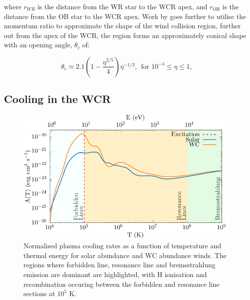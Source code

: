 where $r_{WR}$ is the distance from the WR star to the WCR apex, and $r_\text{OB}$ is the distance from the OB star to the WCR apex.
Work by \cite{eichler_particle_1993} goes further to utilise the momentum ratio to approximate the shape of the wind collision region, further out from the apex of the WCR, the region forms an approximately conical shape with an opening angle, $\theta_c$ of:

\begin{equation}
  \theta_c \simeq 2.1 \left(1 - \frac{\eta^{2/5}}{4}\right) \eta^{-1/3}, ~~ \text{for } 10^{-4} \leq \eta \leq 1, \label{eq:conic}
\end{equation}





\subsection{Cooling in the WCR}
\label{sec:wcrcooling}
\begin{figure}[h]
  \centering
  \includegraphics{assets/cooling-breakdown/cooling-curve-solar-withev.pdf}
  \caption[WC \& solar abundance plasma cooling curves]{Normalised plasma cooling rates as a function of temperature and thermal energy for solar abundance and WC abundance winds. The regions where forbidden line, resonance line and bremsstrahlung emission are dominant are highlighted, with H ionisation and recombination occuring between the forbidden and resonance line sections at $10^5$ \si{\kelvin}.}
  \label{fig:wcsolcooling}
\end{figure}

